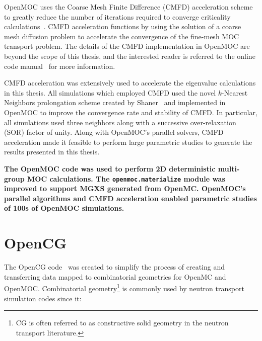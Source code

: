 OpenMOC uses the Coarse Mesh Finite Difference (CMFD) acceleration scheme to greatly reduce the number of iterations required to converge criticality calculations~\cite{boyd2014openmoc}. \ac{CMFD} acceleration functions by using the solution of a coarse mesh diffusion problem to accelerate the convergence of the fine-mesh \ac{MOC} transport problem. The details of the \ac{CMFD} implementation in OpenMOC are beyond the scope of this thesis, and the interested reader is referred to the online code manual~\cite{openmoc2016manual} for more information. 

\ac{CMFD} acceleration was extensively used to accelerate the eigenvalue calculations in this thesis. All simulations which employed \ac{CMFD} used the novel $k$-Nearest Neighbors prolongation scheme created by Shaner~\cite{shaner2015cmfd} and implemented in OpenMOC to improve the convergence rate and stability of \ac{CMFD}. In particular, all simulations used three neighbors along with a successive over-relaxation (SOR) factor of unity. Along with OpenMOC's parallel solvers, \ac{CMFD} acceleration made it feasible to perform large parametric studies to generate the results presented in this thesis.


\begin{emphbox}
\textbf{The OpenMOC code was used to perform 2D deterministic multi-group \ac{MOC} calculations. The \texttt{openmoc.materialize} module was improved to support \ac{MGXS} generated from OpenMC. OpenMOC's parallel algorithms and \ac{CMFD} acceleration enabled parametric studies of 100s of OpenMOC simulations.}
\end{emphbox}


\section{OpenCG}
\label{sec:chap4-opencg}

The OpenCG code~\cite{boyd2015opencg} was created to simplify the process of creating and transferring data mapped to combinatorial geometries for OpenMC and OpenMOC. Combinatorial geometry\footnote{\ac{CG} is often referred to as constructive solid geometry in the neutron transport literature.} is commonly used by neutron transport simulation codes since it:

